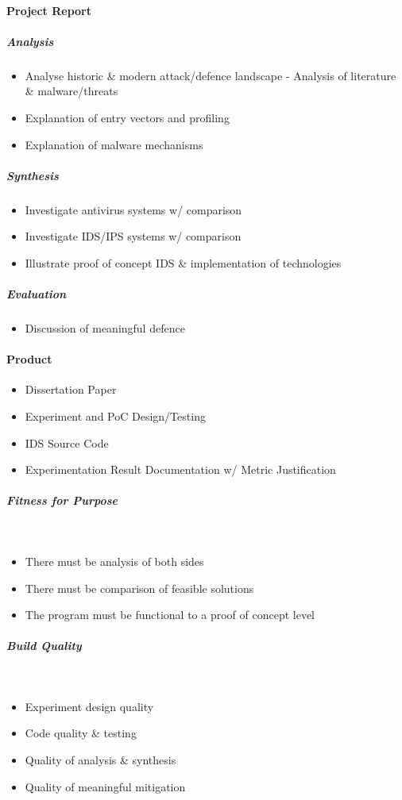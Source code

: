 \paragraph{Project Report}
\subparagraph{Analysis}
\begin{itemize}
	\item Analyse historic \& modern attack/defence landscape - Analysis of
		literature \& malware/threats 
	\item Explanation of entry vectors and profiling
	\item Explanation of malware mechanisms
\end{itemize}

\subparagraph{Synthesis}
\begin{itemize}
	\item Investigate antivirus systems w/ comparison
	\item Investigate IDS/IPS systems w/ comparison
	\item Illustrate proof of concept IDS \& implementation of technologies
\end{itemize}

\subparagraph{Evaluation}
\begin{itemize}
	\item Discussion of meaningful defence
\end{itemize}

\paragraph{Product}
\begin{itemize}
	\item Dissertation Paper
	\item Experiment and PoC Design/Testing
	\item IDS Source Code
	\item Experimentation Result Documentation w/ Metric Justification
\end{itemize}

\subparagraph{Fitness for Purpose}~
\begin{itemize}
	\item There must be analysis of both sides
	\item There must be comparison of feasible solutions
	\item The program must be functional to a proof of concept level
\end{itemize}

\subparagraph{Build Quality}~
\begin{itemize}
	\item Experiment design quality
	\item Code quality \& testing
	\item Quality of analysis \& synthesis
	\item Quality of meaningful mitigation
\end{itemize}
